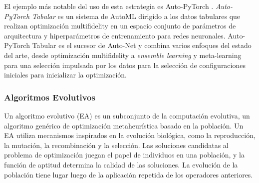 El ejemplo más notable del uso de esta estrategia es Auto-PyTorch \cite{zimmer2021auto}. \textit{Auto-PyTorch Tabular} es un sistema de AutoML dirigido a los datos tabulares que realizan optimización  multifidelity en un espacio conjunto de parámetros de arquitectura y hiperparámetros de entrenamiento para redes neuronales. Auto-PyTorch Tabular es el sucesor de Auto-Net y combina varios enfoques del estado del arte, desde optimización multifidelity a \textit{ensemble learning} y meta-learning para una selección impulsada por los datos para la selección de configuraciones iniciales para inicializar la optimización.

\subsubsection{Algoritmos Evolutivos}



Un algoritmo evolutivo (EA) es un subconjunto de la computación evolutiva, un algoritmo genérico de optimización metaheurística basado en la población. Un EA utiliza mecanismos inspirados en la evolución biológica, como la reproducción, la mutación, la recombinación y la selección. Las soluciones candidatas al problema de optimización juegan el papel de individuos en una población, y la función de aptitud determina la calidad de las soluciones. La evolución de la población tiene lugar luego de la aplicación repetida de los operadores anteriores.


